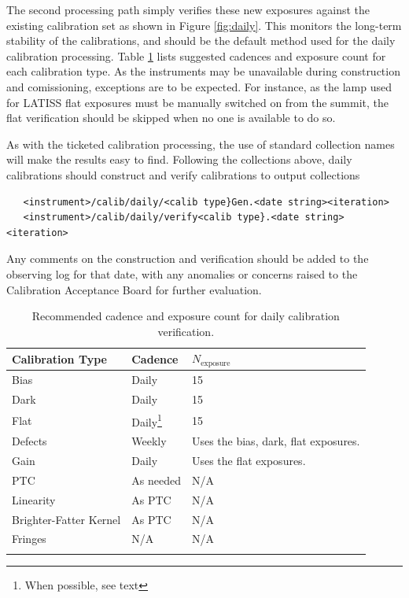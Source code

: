 \documentclass[DM,authoryear,toc]{lsstdoc}
\begin{document}
The second processing path simply verifies these new exposures against the existing calibration set as shown in Figure \ref{fig:daily}.  This monitors the long-term stability of the calibrations, and should be the default method used for the daily calibration processing.  Table \ref{tab:cadence} lists suggested cadences and exposure count for each calibration type.  As the instruments may be unavailable during construction and comissioning, exceptions are to be expected.  For instance, as the lamp used for LATISS flat exposures must be manually switched on from the summit, the flat verification should be skipped when no one is available to do so.

As with the ticketed calibration processing, the use of standard collection names will make the results easy to find.  Following the collections above, daily calibrations should construct and verify calibrations to output collections
\begin{verbatim}
   <instrument>/calib/daily/<calib type}Gen.<date string><iteration>
   <instrument>/calib/daily/verify<calib type}.<date string><iteration>
\end{verbatim}

Any comments on the construction and verification should be added to the observing log for that date, with any anomalies or concerns raised to the Calibration Acceptance Board for further evaluation.

\begin{longtable}{l l l}
  Calibration Type & Cadence & $N_{\textrm{exposure}}$ \\
  \hline
  \endhead
  Bias       & Daily  & 15 \\
  Dark       & Daily  & 15 \\
  Flat       & Daily\footnote{When possible, see text} & 15 \\
  Defects    & Weekly & Uses the bias, dark, flat exposures. \\
  Gain       & Daily  & Uses the flat exposures. \\
  PTC        & As needed & N/A \\
  Linearity  & As PTC    & N/A \\
  Brighter-Fatter Kernel & As PTC & N/A \\
  Fringes    & N/A  & N/A \\
  \hline
  \caption{Recommended cadence and exposure count for daily calibration verification.}
  \label{tab:cadence}
\end{longtable}
\end{document}
